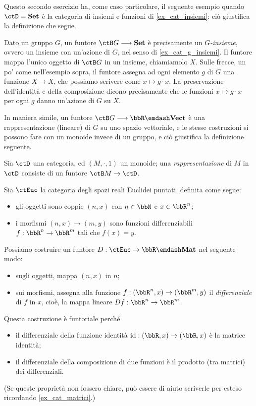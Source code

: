 Questo secondo esercizio ha, come caso particolare, il seguente esempio quando \(\ctD=\ctSet\) è la categoria di insiemi e funzioni di \ref{ex_cat_insiemi}: ciò giustifica la definizione che segue.
\begin{example}\label{exa_azioni_funtori}
	Dato un gruppo \(G\), un funtore \(\ctB G\fun\ctSet\) è precisamente un \emph{\(G\)-insieme}, ovvero un insieme con un'azione di \(G\), nel senso di \ref{ex_cat_g_insiemi}.
	Il funtore mappa l'unico oggetto di \(\ctB G\) in un insieme, chiamiamolo \(X\).
	Sulle frecce, un po' come nell'esempio sopra, il funtore assegna ad ogni elemento \(g\) di \(G\) una funzione \(X\to X\), che possiamo scrivere come \(x\mapsto g\cdot x\).
	La preservazione dell'identità e della composizione dicono precisamente che le funzioni \(x\mapsto g\cdot x\) per ogni \(g\) danno un'azione di \(G\) su \(X\).

\end{example}
In maniera simile, un funtore \(\ctB G\fun\bbR\emdash\ctVect\) è una rappresentazione (lineare) di \(G\) su uno spazio vettoriale, e le stesse costruzioni si possono fare con un monoide invece di un gruppo, e ciò giustifica la definizione seguente.
\begin{definition}[Rappresentazione di \(M\)]
	Sia \(\ctD\) una categoria, ed \((M,\cdot,1)\) un monoide; una \emph{rappresentazione} di \(M\) in \(\ctD\) consiste di un funtore \(\ctB M \to \ctD\).
\end{definition}
\begin{example}\label{exa_derivata_funtore}
	Sia \(\ctEuc\) la categoria degli spazi reali Euclidei puntati, definita come segue:
	\begin{itemize}
		\item gli oggetti sono coppie \((n,x)\) con \(n\in\bbN\) e \(x\in\bbR^n\);
		\item i morfismi \((n,x)\to (m,y)\) sono funzioni differenziabili \(f:\bbR^n\to\bbR^m\) tali che \(f(x)=y\).
	\end{itemize}
	Possiamo costruire un funtore \(D:\ctEuc\to\bbR\emdash\cate{Mat}\) nel seguente modo:
	\begin{itemize}
		\item sugli oggetti, mappa \((n,x)\) in \(n\);
		\item sui morfismi, assegna alla funzione \(f:(\bbR^n,x)\to (\bbR^m,y)\) il \emph{differenziale} di \(f\) in \(x\), cioè, la mappa lineare \(Df:\bbR^n\to\bbR^m\).
	\end{itemize}
	Questa costruzione è funtoriale perché
	\begin{itemize}
		\item il differenziale della funzione identità \(\id : (\bbR,x) \to (\bbR,x)\) è la matrice identità;
		\item il differenziale della composizione di due funzioni è il prodotto (tra matrici) dei differenziali.
	\end{itemize}
	(Se queste proprietà non fossero chiare, può essere di aiuto scriverle per esteso ricordando \ref{ex_cat_matrici}.)
\end{example}
